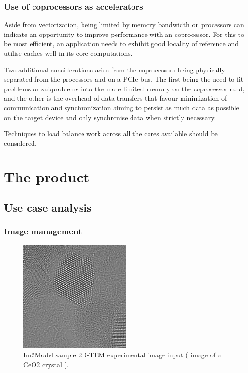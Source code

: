 \documentclass[
  oneside,
  11pt, a4paper,
  footinclude=true,
  headinclude=true,
  cleardoublepage=empty
]{scrbook}
\begin{document}
\subsection{Use of coprocessors as accelerators}

Aside from vectorization, being limited by memory bandwidth on processors can indicate an opportunity to improve performance with an  coprocessor. For this to be most efficient, an application needs to exhibit good locality of reference and utilise caches well in its core computations.\par 

Two additional considerations arise from the coprocessors  being physically separated from the processors and on a PCIe bus. The first being the need to fit problems or subproblems into the more limited memory on the coprocessor card, and the other is the overhead of data transfers that favour minimization of communication and synchronization aiming to persist as much data as possible on the target device and only synchronise data when strictly necessary. \par 
Techniques to load balance work across all the cores available should be considered.






	
	\chapter{The product}
	
	\section{Use case analysis}
	\subsection{Image management}
	
	\begin{figure}[h!]
	\begin{center}
		\includegraphics[width=0.5\textwidth]{img/T_CeO2_a.png}
			\caption[Im2Model sample 2D-TEM experimental image input]{Im2Model sample 2D-TEM experimental image input ( image of a CeO2 crystal ).}
	\label{fig:cerium_oxide_exp}
	\end{center}
	\end{figure}
	
\end{document}
